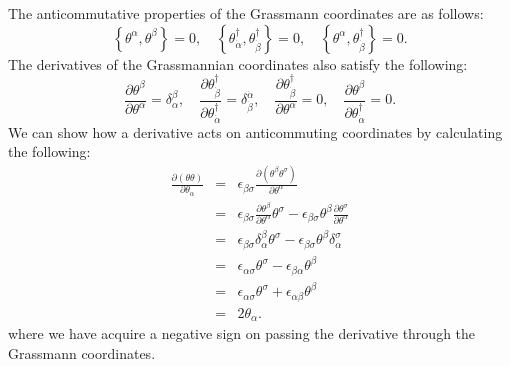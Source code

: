 The anticommutative properties of the Grassmann coordinates are as follows:
\begin{equation}
\left\{ \theta^{\alpha},\theta^{\beta}\right\} =0,\quad\left\{ \theta_{\dot{\alpha}}^{\dagger},\theta_{\dot{\beta}}^{\dagger}\right\} =0,\quad\left\{ \theta^{\alpha},\theta_{\dot{\beta}}^{\dagger}\right\} =0.
\end{equation}
The derivatives of the Grassmannian coordinates also satisfy the following:
\begin{equation}
\frac{\partial\theta^{\beta}}{\partial\theta^{\alpha}}=\delta_{\alpha}^{\beta},\quad\frac{\partial\theta_{\dot{\beta}}^{\dagger}}{\partial\theta_{\dot{\alpha}}^{\dagger}}=\delta_{\dot{\beta}}^{\dot{\alpha}},\quad \frac{\partial\theta_{\dot{\beta}}^{\dagger}}{\partial\theta^{\alpha}}=0,\quad\frac{\partial\theta^{\beta}}{\partial\theta_{\dot{\alpha}}^{\dagger}}=0.
\end{equation}
We can show how a derivative acts on anticommuting coordinates by calculating the following:
\begin{eqnarray}
\frac{\partial\left(\theta\theta\right)}{\partial\theta_{\alpha}}	&=&	\epsilon_{\beta\sigma}\frac{\partial\left(\theta^{\beta}\theta^{\sigma}\right)}{\partial\theta^{\alpha}} \nonumber \\
	&=&	\epsilon_{\beta\sigma}\frac{\partial\theta^{\beta}}{\partial\theta^{\alpha}}\theta^{\sigma}-\epsilon_{\beta\sigma}\theta^{\beta}\frac{\partial\theta^{\sigma}}{\partial\theta^{\alpha}} \nonumber \\
	&=&	\epsilon_{\beta\sigma}\delta_{\alpha}^{\beta}\theta^{\sigma}-\epsilon_{\beta\sigma}\theta^{\beta}\delta_{\alpha}^{\sigma} \nonumber \\
	&=&	\epsilon_{\alpha\sigma}\theta^{\sigma}-\epsilon_{\beta\alpha}\theta^{\beta} \nonumber \\
	&=&	\epsilon_{\alpha\sigma}\theta^{\sigma}+\epsilon_{\alpha\beta}\theta^{\beta} \nonumber \\
	&=&	2\theta_{\alpha}. \label{eqn:derivexample}
\end{eqnarray}
where we have acquire a negative sign on passing the derivative through the Grassmann coordinates. 

